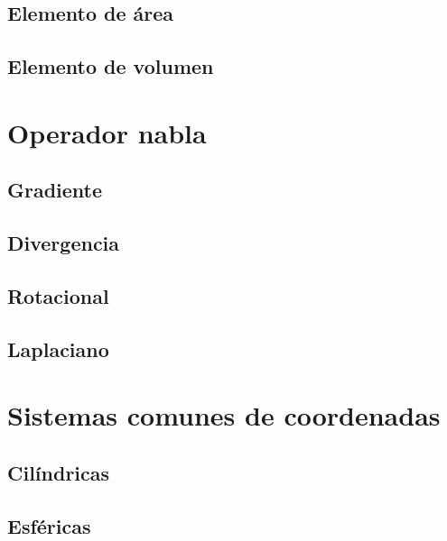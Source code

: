 \documentclass[12pt, fleqn]{report}                             %
\begin{document}
			\subsection{Elemento de área}
			
			\subsection{Elemento de volumen}
			
		\section{Operador nabla}
		
			\subsection{Gradiente}
			
			\subsection{Divergencia}
			
			\subsection{Rotacional}
			
			\subsection{Laplaciano}
			
		\section{Sistemas comunes de coordenadas}
		
			\subsection{Cilíndricas}
			
			\subsection{Esféricas}
            
\end{document}
